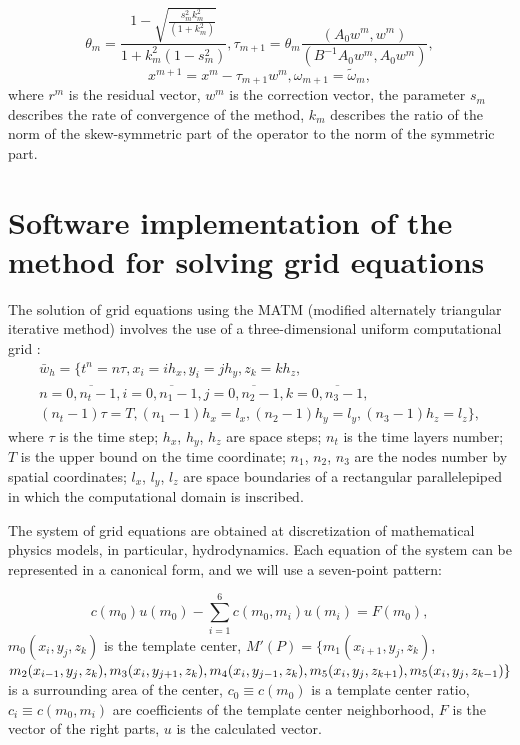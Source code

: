 \documentclass{svproc}
\begin{document}
\begin{equation*}	
	\theta_m =
	\frac
	{ 1 - \sqrt{\frac{s_m^2 k_m^2}{ \left( 1 + k_m^2 \right)}}}
	{ 1 + k_m^2 \left( 1 - s_m^2 \right) },
	\tau_{m+1} = \theta_m
	\frac
	{\left( A_0 w^m, w^m \right)}
	{\left( B^{-1} A_0 w^m, A_0 w^m \right)},		
\end{equation*}
\begin{equation*}
	x^{m+1} = x^m - \tau_{m+1} w^m,
	\omega_{m+1} = \tilde{\omega}_m,
\end{equation*}
where  $r^m$ is the residual vector,
$w^m$ is the correction vector,
the parameter $s_m$ describes the rate of convergence of the method,
$k_m$ describes the ratio of the norm of the skew-symmetric part of the operator to the norm of the symmetric part.



%
\section{Software implementation of the method for solving grid equations}
%
The solution of grid equations using the MATM (modified alternately triangular iterative method) involves the use of a three-dimensional uniform computational grid \cite{2014:Oyarzun}:
\begin{multline*}
	\bar w_h = \lbrace {t^n=n \tau, x_i = ih_x, y_i=jh_y, z_k=kh_z,}\\
		n=\overline {0, n_t-1}, i= \overline {0, n_1-1}, 
	j = \overline{0, n_2-1}, k = \overline{0, n_3-1},\\
	\left(n_t-1\right)\tau = { T,
		\left(n_1-1\right)h_x=l_x,
		\left(n_2-1\right)h_y=l_y,
		\left(n_3-1\right)h_z=l_z} \rbrace,
\end{multline*}
where
$\tau$  is the time step;
$h_x$, $h_y$, $h_z$ are space steps;
$n_t$ is the time layers number;
$T$ is the upper bound on the time coordinate;
$n_1$, $n_2$, $n_3$ are the nodes number by spatial coordinates;
$l_x$, $l_y$, $l_z$  are space boundaries of a rectangular parallelepiped in which the computational domain is inscribed.

The system of grid equations are obtained at discretization of mathematical physics models, in particular, hydrodynamics. Each equation of the system can be represented in a canonical form, and we will use a seven-point pattern:

\begin{equation*}
	c(m_0)u(m_0) - \sum_{i=1}^{6}c(m_0,m_i)u(m_i)=F(m_0),
\end{equation*}
$m_0(x_i, y_j, z_k)$  is the template center,
$M'(P)=\{m_1(x_{i+1},y_j, z_k)$, $  m_2(x_{i-1}, y_j, z_k),\\ m_3(x_i,y_{j+1}, z_k), m_4(x_i,y_{j-1}, z_k), m_5(x_i,y_j, z_{k+1}), m_5(x_i,y_j, z_{k-1})\}$ is a surrounding area of the center,
$c_0\equiv c(m_0)$  is a template center ratio,
$c_i\equiv c(m_0, m_i)$ are coefficients of the template center neighborhood, $F$ is the vector of the right parts,
$u$ is the calculated vector.
\end{document}
